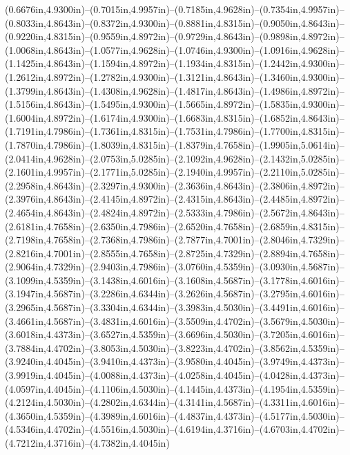 (0.6676in,4.9300in)--(0.7015in,4.9957in)--(0.7185in,4.9628in)--(0.7354in,4.9957in)--(0.8033in,4.8643in)--(0.8372in,4.9300in)--(0.8881in,4.8315in)--(0.9050in,4.8643in)--(0.9220in,4.8315in)--(0.9559in,4.8972in)--(0.9729in,4.8643in)--(0.9898in,4.8972in)--(1.0068in,4.8643in)--(1.0577in,4.9628in)--(1.0746in,4.9300in)--(1.0916in,4.9628in)--(1.1425in,4.8643in)--(1.1594in,4.8972in)--(1.1934in,4.8315in)--(1.2442in,4.9300in)--(1.2612in,4.8972in)--(1.2782in,4.9300in)--(1.3121in,4.8643in)--(1.3460in,4.9300in)--(1.3799in,4.8643in)--(1.4308in,4.9628in)--(1.4817in,4.8643in)--(1.4986in,4.8972in)--(1.5156in,4.8643in)--(1.5495in,4.9300in)--(1.5665in,4.8972in)--(1.5835in,4.9300in)--(1.6004in,4.8972in)--(1.6174in,4.9300in)--(1.6683in,4.8315in)--(1.6852in,4.8643in)--(1.7191in,4.7986in)--(1.7361in,4.8315in)--(1.7531in,4.7986in)--(1.7700in,4.8315in)--(1.7870in,4.7986in)--(1.8039in,4.8315in)--(1.8379in,4.7658in)--(1.9905in,5.0614in)--(2.0414in,4.9628in)--(2.0753in,5.0285in)--(2.1092in,4.9628in)--(2.1432in,5.0285in)--(2.1601in,4.9957in)--(2.1771in,5.0285in)--(2.1940in,4.9957in)--(2.2110in,5.0285in)--(2.2958in,4.8643in)--(2.3297in,4.9300in)--(2.3636in,4.8643in)--(2.3806in,4.8972in)--(2.3976in,4.8643in)--(2.4145in,4.8972in)--(2.4315in,4.8643in)--(2.4485in,4.8972in)--(2.4654in,4.8643in)--(2.4824in,4.8972in)--(2.5333in,4.7986in)--(2.5672in,4.8643in)--(2.6181in,4.7658in)--(2.6350in,4.7986in)--(2.6520in,4.7658in)--(2.6859in,4.8315in)--(2.7198in,4.7658in)--(2.7368in,4.7986in)--(2.7877in,4.7001in)--(2.8046in,4.7329in)--(2.8216in,4.7001in)--(2.8555in,4.7658in)--(2.8725in,4.7329in)--(2.8894in,4.7658in)--(2.9064in,4.7329in)--(2.9403in,4.7986in)--(3.0760in,4.5359in)--(3.0930in,4.5687in)--(3.1099in,4.5359in)--(3.1438in,4.6016in)--(3.1608in,4.5687in)--(3.1778in,4.6016in)--(3.1947in,4.5687in)--(3.2286in,4.6344in)--(3.2626in,4.5687in)--(3.2795in,4.6016in)--(3.2965in,4.5687in)--(3.3304in,4.6344in)--(3.3983in,4.5030in)--(3.4491in,4.6016in)--(3.4661in,4.5687in)--(3.4831in,4.6016in)--(3.5509in,4.4702in)--(3.5679in,4.5030in)--(3.6018in,4.4373in)--(3.6527in,4.5359in)--(3.6696in,4.5030in)--(3.7205in,4.6016in)--(3.7884in,4.4702in)--(3.8053in,4.5030in)--(3.8223in,4.4702in)--(3.8562in,4.5359in)--(3.9240in,4.4045in)--(3.9410in,4.4373in)--(3.9580in,4.4045in)--(3.9749in,4.4373in)--(3.9919in,4.4045in)--(4.0088in,4.4373in)--(4.0258in,4.4045in)--(4.0428in,4.4373in)--(4.0597in,4.4045in)--(4.1106in,4.5030in)--(4.1445in,4.4373in)--(4.1954in,4.5359in)--(4.2124in,4.5030in)--(4.2802in,4.6344in)--(4.3141in,4.5687in)--(4.3311in,4.6016in)--(4.3650in,4.5359in)--(4.3989in,4.6016in)--(4.4837in,4.4373in)--(4.5177in,4.5030in)--(4.5346in,4.4702in)--(4.5516in,4.5030in)--(4.6194in,4.3716in)--(4.6703in,4.4702in)--(4.7212in,4.3716in)--(4.7382in,4.4045in)
